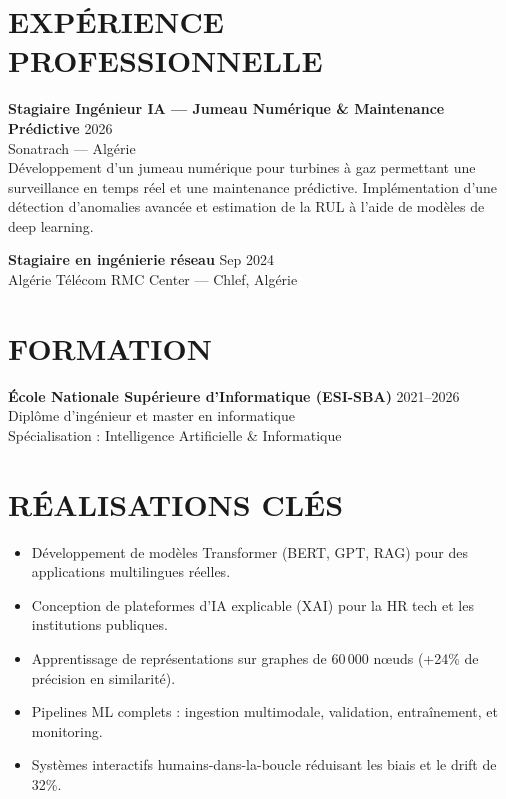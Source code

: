 \documentclass[a4paper,12pt]{article}
\begin{document}
\section{EXPÉRIENCE PROFESSIONNELLE}
\textbf{Stagiaire Ingénieur IA — Jumeau Numérique \& Maintenance Prédictive} \hfill 2026 \\
Sonatrach — Algérie \\
Développement d’un jumeau numérique pour turbines à gaz permettant une surveillance en temps réel et une maintenance prédictive. Implémentation d’une détection d’anomalies avancée et estimation de la RUL à l’aide de modèles de deep learning.

\textbf{Stagiaire en ingénierie réseau} \hfill Sep 2024 \\
Algérie Télécom RMC Center — Chlef, Algérie

\section{FORMATION}
\textbf{École Nationale Supérieure d’Informatique (ESI-SBA)} \hfill 2021--2026 \\
Diplôme d’ingénieur et master en informatique \\
Spécialisation : Intelligence Artificielle \& Informatique

\section{RÉALISATIONS CLÉS}
\begin{itemize}
    \item Développement de modèles Transformer (BERT, GPT, RAG) pour des applications multilingues réelles.
    \item Conception de plateformes d’IA explicable (XAI) pour la HR tech et les institutions publiques.
    \item Apprentissage de représentations sur graphes de 60\,000 nœuds (+24\% de précision en similarité).
    \item Pipelines ML complets : ingestion multimodale, validation, entraînement, et monitoring.
    \item Systèmes interactifs humains-dans-la-boucle réduisant les biais et le drift de 32\%.
\end{itemize}

\end{document}
